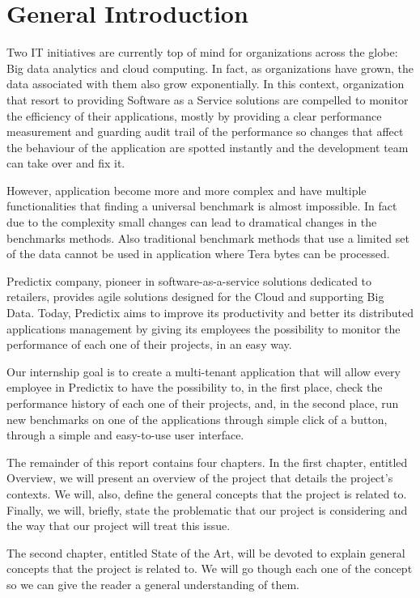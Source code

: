 \chapter*{General Introduction}
Two IT initiatives are currently top of mind for organizations across the globe:
Big data analytics and cloud computing. In fact, as organizations have grown,
the data associated with them also grow exponentially. In this context,
organization that resort to providing Software as a Service solutions are
compelled to monitor the efficiency of their applications, mostly by providing a
clear performance measurement and guarding audit trail of the performance so changes
that affect the behaviour of the application are spotted instantly and the
development team can take over and fix it.

However, application become more and more complex and have multiple
functionalities that finding a universal benchmark is almost impossible. In fact
due to the complexity small changes can lead to dramatical changes in the
benchmarks methods. Also traditional benchmark methods that use a limited set of
the data cannot be used in application where Tera bytes can be processed.

Predictix company, pioneer in software-as-a-service solutions dedicated to
retailers, provides agile solutions designed for the Cloud and supporting Big
Data. Today, Predictix aims to improve its productivity and better its
distributed applications management by giving its employees the possibility to
monitor the performance of each one of their projects, in an easy way.

Our internship goal is to create a multi-tenant application that will allow
every employee in Predictix to have the possibility to, in the first place,
check the performance history of each one of their projects, and, in the second
place, run new benchmarks on one of the applications through simple click of a
button, through a simple and easy-to-use user interface.

The remainder of this report contains four chapters. In the first chapter,
entitled Overview, we will present an overview of the project that details the
project's contexts. We will, also, define the general concepts that the project
is related to. Finally, we will, briefly, state the problematic that our project
is considering and the way that our project will treat this issue.

The second chapter, entitled State of the Art, will be devoted to explain
general concepts that the project is related to. We will go though each one of
the concept so we can give the reader a general understanding of them.


